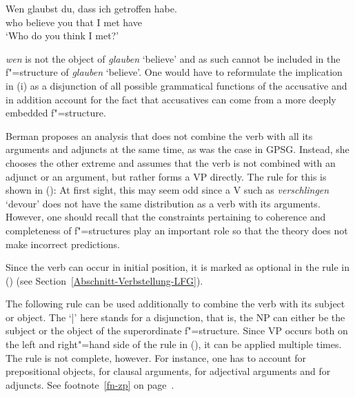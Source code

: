 {{\ea
\gll Wen glaubst du, dass ich getroffen habe.\\
	 who believe you that I met have\\
\glt `Who do you think I met?'
\z

\noindent
\emph{wen} is not the object of \emph{glauben} `believe' and as such cannot be included in the
f"=structure of \emph{glauben} `believe'. One would have to reformulate the implication in
(i) as a disjunction of all possible grammatical functions of the accusative and in addition account for the fact that accusatives can come from a more deeply embedded f"=structure.
}
\ea
\label{le-verschlingen}
\z

\largerpage
\noindent
Berman proposes an analysis that does not combine the verb with all its arguments and adjuncts at
the same time, as was the case in GPSG\indexgpsg. Instead, she chooses the other extreme and assumes
that the verb is not combined with an adjunct or an argument, but rather forms a VP directly. The rule for this is shown in ():
\ea
\label{LFG-v-vp}
\z
At first sight, this may seem odd since a V such as \emph{verschlingen} `devour' does not have the same distribution as a verb with its arguments. However, one should recall that the
constraints pertaining to coherence and completeness of f"=structures play an important role so that
the theory does not make incorrect predictions.
}%

Since the verb can occur in initial position, it is marked as optional in the rule in () (see Section~\ref{Abschnitt-Verbstellung-LFG}).

The following rule can be used additionally to combine the verb with its subject or object.
\ea
\label{lfg-vp-regel}
\z
The `|'\is{$\vert$} here stands for a disjunction, that is, the NP can either be the subject or the object of the superordinate f"=structure. Since VP occurs both on the left
and right"=hand side of the rule in (), it can be applied multiple times.
The rule is not complete, however. For instance, one has to account for prepositional objects, for clausal
arguments, for adjectival arguments and for adjuncts. See footnote~\ref{fn-zp} on page~\pageref{fn-zp}.

